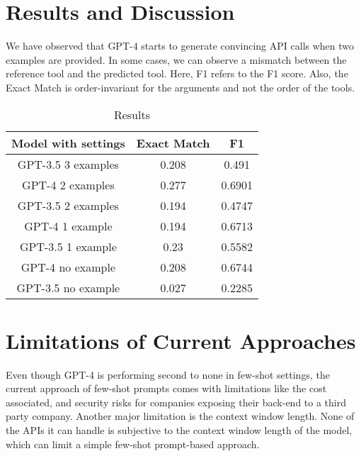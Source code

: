 \documentclass[10pt,twocolumn,letterpaper]{article}
\begin{document}
\section{Results and Discussion}
We have observed that GPT-4 starts to generate convincing API calls when two examples are provided. In some cases, we can observe a mismatch between the reference tool and the predicted tool. Here, F1 refers to the F1 score. Also, the Exact Match is order-invariant for the arguments and not the order of the tools.

\begin{table}[htp]
\centering
\begin{tabular}{|c|c|c|}
\hline
\textbf{Model with settings} & \textbf{Exact Match} & \textbf{F1} \\ \hline
GPT-3.5 3 examples           & 0.208       & 0.491       \\ \hline
GPT-4 2 examples             & 0.277       & 0.6901      \\ \hline
GPT-3.5 2 examples           & 0.194       & 0.4747      \\ \hline
GPT-4 1 example              & 0.194       & 0.6713      \\ \hline
GPT-3.5 1 example            & 0.23        & 0.5582      \\ \hline
GPT-4 no example             & 0.208       & 0.6744      \\ \hline
GPT-3.5 no example           & 0.027       & 0.2285      \\ \hline
\end{tabular}
\caption{Results}
\end{table}


\section{Limitations of Current Approaches}
Even though GPT-4 is performing second to none in few-shot settings, the current approach of few-shot prompts comes with limitations like the cost associated, and security risks for companies exposing their back-end to a third party company. Another major limitation is the context window length. None of the APIs it can handle is subjective to the context window length of the model, which can limit a simple few-shot prompt-based approach.
\end{document}

